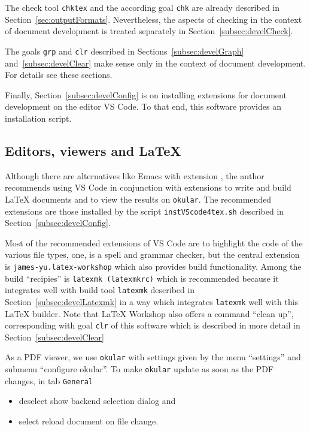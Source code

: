 The check tool \texttt{chktex} and the according goal \texttt{chk} 
are already described in Section~\ref{sec:outputFormats}. 
Nevertheless, the aspects of checking 
in the context of document development is treated separately 
in Section~\ref{subsec:develCheck}. 

The goals \texttt{grp} and \texttt{clr} 
described in Sections~\ref{subsec:develGraph} and~\ref{subsec:develClear} 
make sense only in the context of document development. 
For details see these sections. 

Finally, Section~\ref{subsec:develConfig} 
is on installing extensions for document development on the editor VS Code. 
To that end, this software provides an installation script. 


\subsection{Editors, viewers and \LaTeX}\label{subsec:editViewLatex}

Although there are alternatives like Emacs with extension \auctex, 
the author recommends using VS Code in conjunction with extensions 
to write and build \LaTeX{} documents 
and to view the results on \texttt{okular}. 
The recommended extensions are those 
installed by the script \texttt{instVScode4tex.sh} 
described in Section~\ref{subsec:develConfig}. 

Most of the recommended extensions of VS Code 
are to highlight the code of the various file types, 
one, \ltex{} is a spell and grammar checker, 
but the central extension is \texttt{james-yu.latex-workshop} 
which also provides build functionality. 
Among the build ``recipies'' is \texttt{latexmk (latexmkrc)} 
which is recommended because it integrates well with build tool \texttt{latexmk} 
described in Section~\ref{subsec:develLatexmk} 
in a way which integrates \texttt{latexmk} well with this \LaTeX{} builder. 
Note that \LaTeX{} Workshop also offers a command ``clean up'', 
corresponding with goal \texttt{clr} of this software 
which is described in more detail in Section~\ref{subsec:develClear}

As a PDF viewer, we use \texttt{okular} 
with settings given by the menu ``settings'' 
and submenu ``configure okular''. 
To make \texttt{okular} update as soon as the PDF changes, 
in tab \texttt{General} 
\begin{itemize}
  \item deselect show backend selection dialog and 
  \item select reload document on file change. 
\end{itemize}

